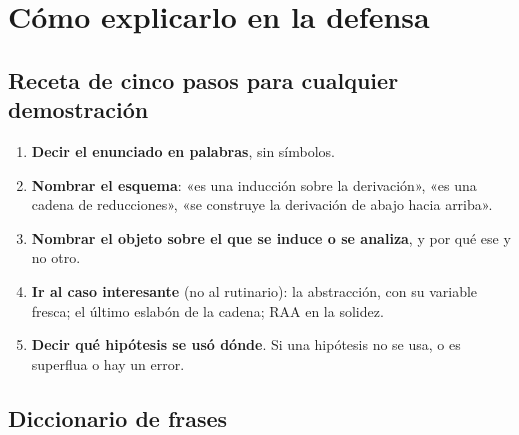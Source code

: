 \documentclass[11pt,a4paper]{article}
\begin{document}
\section{Cómo explicarlo en la defensa}

\subsection{Receta de cinco pasos para cualquier demostración}

\begin{enumerate}
  \item \textbf{Decir el enunciado en palabras}, sin símbolos.
  \item \textbf{Nombrar el esquema}: «es una inducción sobre la derivación»,
    «es una cadena de reducciones», «se construye la derivación de abajo
    hacia arriba».
  \item \textbf{Nombrar el objeto sobre el que se induce o se analiza}, y por
    qué ese y no otro.
  \item \textbf{Ir al caso interesante} (no al rutinario): la abstracción, con
    su variable fresca; el último eslabón de la cadena; RAA en la solidez.
  \item \textbf{Decir qué hipótesis se usó dónde}. Si una hipótesis no se
    usa, o es superflua o hay un error.
\end{enumerate}

\subsection{Diccionario de frases}
\end{document}
